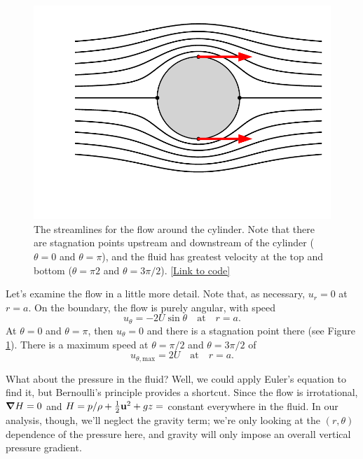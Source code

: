 \begin{figure}
\centering\includegraphics[width=0.7\linewidth]{Figures/Chapter3/fig_cylinder_stream}
\caption{The streamlines for the flow around the cylinder.  Note that there are stagnation points upstream and downstream of the cylinder ($\theta = 0$ and $\theta = \pi$), and the fluid has greatest velocity at the top and bottom ($\theta = \pi2$ and $\theta = 3\pi/2$).  \href{https://nbviewer.jupyter.org/github/josephmacmillan/IntroFluidDynamics/blob/master/Jupyter/3-IdealFluids.ipynb\#Figure-3.5:-Streamlines-for-flow-past-a-cylinder}{[Link to code]}}
\label{fig_cyl_streamlines}
\end{figure}

Let's examine the flow in a little more detail.  Note that, as necessary, $u_r=0$ at $r=a$.  On the boundary, the flow is purely angular, with speed 
\[
u_\theta = -2U \sin \theta \quad \text{at} \quad r=a.
\]
At $\theta = 0$ and $\theta = \pi$, then $u_\theta = 0$ and there is a stagnation point there (see Figure \ref{fig_cyl_streamlines}).  There is a maximum speed at $\theta = \pi/2$ and $\theta = 3\pi/2$ of
\[
u_{\theta, \text{max}} = 2U \quad \text{at} \quad r=a.
\]

What about the pressure in the fluid?  Well, we could apply Euler's equation to find it, but Bernoulli's principle provides a shortcut.  Since the flow is irrotational, $\boldsymbol{\nabla} H = 0$ and $H = p/\rho + \tfrac{1}{2} \mathbf{u}^2 + gz = $ constant everywhere in the fluid.  In our analysis, though, we'll neglect the gravity term; we're only looking at the $(r, \theta)$ dependence of the pressure here, and gravity will only impose an overall vertical pressure gradient.

